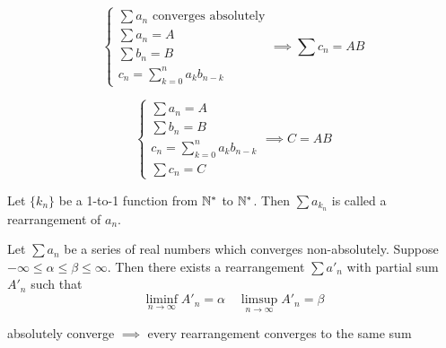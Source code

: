     \begin{theo}
        \begin{equation}
            \begin{cases}
                \sum a_n \text{ converges absolutely} \\
                \sum a_n = A \\
                \sum b_n = B \\
                c_n = \sum_{k=0}^n a_k b_{n-k}
            \end{cases}
            \implies \sum c_n = AB
        \end{equation}
    \end{theo}

    \begin{theo}
        \begin{equation}
            \begin{cases}
                \sum a_n = A \\
                \sum b_n = B \\
                c_n = \sum_{k=0}^n a_k b_{n-k} \\
                \sum c_n = C
            \end{cases}
            \implies C = AB
        \end{equation}
    \end{theo}

    \begin{defi}
        Let $\{k_n\}$ be a 1-to-1 function from $\mathbb{N}^*$ to $\mathbb{N}^*$. Then $\sum a_{k_n}$ is called a rearrangement of $a_n$.
    \end{defi}

    \begin{theo}
        Let $\sum a_n$ be a series of real numbers which converges non-absolutely. Suppose $-\infty \leq \alpha \leq \beta \leq \infty$. Then there exists a rearrangement $\sum a'_n$ with partial sum $A'_n$ such that
        \begin{equation}
            \liminf_{n \to \infty} A'_n = \alpha \quad \limsup_{n \to \infty} A'_n = \beta
        \end{equation}
    \end{theo}

    \begin{theo}
        absolutely converge $\implies$ every rearrangement converges to the same sum
    \end{theo}